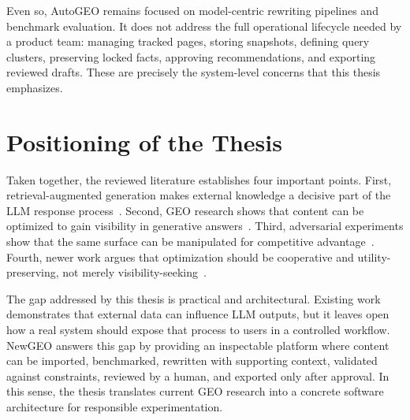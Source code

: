 Even so, AutoGEO remains focused on model-centric rewriting pipelines and benchmark
evaluation. It does not address the full operational lifecycle needed by a product team:
managing tracked pages, storing snapshots, defining query clusters, preserving locked facts,
approving recommendations, and exporting reviewed drafts. These are precisely the system-level
concerns that this thesis emphasizes.

\section{Positioning of the Thesis}

Taken together, the reviewed literature establishes four important points. First,
retrieval-augmented generation makes external knowledge a decisive part of the LLM response
process~\cite{gao2024ragsurvey}. Second, GEO research shows that content can be optimized to
gain visibility in generative answers~\cite{aggarwal2024geo}. Third, adversarial experiments
show that the same surface can be manipulated for competitive advantage~\cite{kumar2024manipulating}.
Fourth, newer work argues that optimization should be cooperative and utility-preserving, not
merely visibility-seeking~\cite{wu2025autogeo}.

The gap addressed by this thesis is practical and architectural. Existing work demonstrates that
external data can influence LLM outputs, but it leaves open how a real system should expose
that process to users in a controlled workflow. NewGEO answers this gap by providing an
inspectable platform where content can be imported, benchmarked, rewritten with supporting
context, validated against constraints, reviewed by a human, and exported only after approval.
In this sense, the thesis translates current GEO research into a concrete software architecture
for responsible experimentation.
